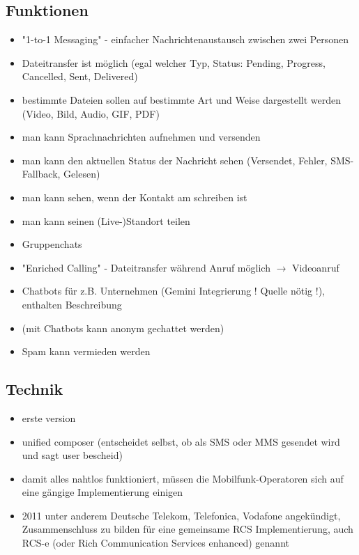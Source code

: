 \documentclass[conference]{IEEEtran}
\begin{document}
\subsection{Funktionen}

\begin{itemize}
    \item "1-to-1 Messaging" - einfacher Nachrichtenaustausch zwischen zwei Personen
    \item Dateitransfer ist möglich (egal welcher Typ, Status: Pending, Progress, Cancelled, Sent, Delivered)
    \item bestimmte Dateien sollen auf bestimmte Art und Weise dargestellt werden (Video, Bild, Audio, GIF, PDF)
    \item man kann Sprachnachrichten aufnehmen und versenden
    \item man kann den aktuellen Status der Nachricht sehen (Versendet, Fehler, SMS-Fallback, Gelesen)
    \item man kann sehen, wenn der Kontakt am schreiben ist
    \item man kann seinen (Live-)Standort teilen
    \item Gruppenchats
    \item "Enriched Calling" - Dateitransfer während Anruf möglich $\rightarrow$ Videoanruf
    \item Chatbots für z.B. Unternehmen (Gemini Integrierung ! Quelle nötig !), enthalten Beschreibung
    \item (mit Chatbots kann anonym gechattet werden)
    \item Spam kann vermieden werden
\end{itemize}
\cite{uniprof}

\subsection{Technik}

\begin{itemize}
    \item erste version
    \item unified composer (entscheidet selbst, ob als SMS oder MMS gesendet wird und sagt user bescheid)
\end{itemize}
\cite{rcsuite}

\begin{itemize}
    \item damit alles nahtlos funktioniert, müssen die Mobilfunk-Operatoren sich auf eine gängige Implementierung einigen
    \item 2011 unter anderem Deutsche Telekom, Telefonica, Vodafone angekündigt, Zusammenschluss zu bilden für eine gemeinsame RCS Implementierung, auch RCS-e (oder Rich Communication Services enhanced) genannt
\end{itemize}
\cite{rcsmno}
\end{document}
